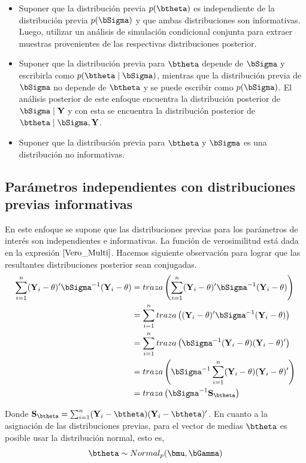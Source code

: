 \documentclass[10pt,openright]{book}\usepackage[]{graphicx}\usepackage[]{color}
\begin{document}
\begin{itemize}
\item Suponer que la distribuci\'on previa $p(\btheta)$ es independiente de la distribuci\'on previa $p(\bSigma)$ y que ambas distribuciones son informativas. Luego, utilizar un an\'alisis de simulaci\'on condicional conjunta para extraer muestras provenientes de las respectivas distribuciones posterior.
\item Suponer que la distribuci\'on previa para $\btheta$ depende de $\bSigma$ y escribirla como $p(\btheta \mid \bSigma)$, mientras que la distribuci\'on previa de $\bSigma$ no depende de $\btheta$ y se puede escribir como $p(\bSigma)$. El an\'alisis posterior de este enfoque encuentra la distribuci\'on posterior de $\bSigma \mid \mathbf{Y}$ y con esta se encuentra la distribuci\'on posterior de $\btheta \mid \bSigma,\mathbf{Y}$.
\item Suponer que la distribuci\'on previa para $\btheta$ y $\bSigma$ es una distribuci\'on no informativas.
\end{itemize}

  
\subsection{Par\'ametros independientes con distribuciones previas informativas}

En este enfoque se supone que las distribuciones previas para los par\'ametros de inter\'es son independientes e informativas. La funci\'on de verosimilitud est\'a dada en la expresi\'on $\ref{Vero_Multi}$. Hacemos siguiente observaci\'on para lograr que las resultantes distribuciones posterior sean conjugadas. 
\begin{align*}
\sum_{i=1}^n(\mathbf{Y}_i-\theta)'\bSigma^{-1}(\mathbf{Y}_i-\theta)&=traza \left(\sum_{i=1}^n(\mathbf{Y}_i-\theta)'\bSigma^{-1}(\mathbf{Y}_i-\theta)\right)\\
&= \sum_{i=1}^ntraza\left((\mathbf{Y}_i-\theta)'\bSigma^{-1}(\mathbf{Y}_i-\theta)\right)\\
&= \sum_{i=1}^ntraza\left(\bSigma^{-1}(\mathbf{Y}_i-\theta)(\mathbf{Y}_i-\theta)'\right)\\
&= traza\left(\bSigma^{-1}\sum_{i=1}^n(\mathbf{Y}_i-\theta)(\mathbf{Y}_i-\theta)'\right)\\
&= traza\left(\bSigma^{-1}\mathbf{S}_{\btheta}\right)
\end{align*}

Donde $\mathbf{S}_{\btheta}=\sum_{i=1}^n(\mathbf{Y}_i-\btheta)(\mathbf{Y}_i-\btheta)'$. En cuanto a la asignaci\'on de las distribuciones previas, para el vector de medias $\btheta$ es posible usar la distribuci\'on normal, esto es,
\begin{equation*}
\btheta \sim Normal_p(\bmu,\bGamma)
\end{equation*}
\end{document}
